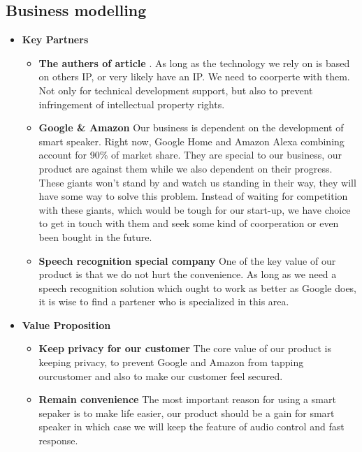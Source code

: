 \documentclass[12pt,twoside]{article}
\begin{document}
\subsection{Business modelling}
\begin{itemize}
\item \textbf{Key Partners}\\
    \begin{itemize}
    \item \textbf{The authers of article} \cite{RoyNirupam2017BMMH}. As long as the technology we rely on is based on others IP, or very likely 
    have an IP. We need to coorperte with them. Not only for technical development support, but also to prevent infringement of 
    intellectual property rights.
    \item \textbf{Google \& Amazon} Our business is dependent on the development of smart speaker. Right now, Google Home and Amazon Alexa combining 
    account for 90\% of market share. They are special to our business, our product are against them while we also dependent on their progress.
    These giants won't stand by and watch us standing in their way, they will have some way to solve this problem. Instead of waiting for competition with 
    these giants, which would be tough for our start-up, we have choice to get in touch with them and seek some kind of coorperation or even been bought 
    in the future.
    \item \textbf{Speech recognition special company} One of the key value of our product is that we do not hurt the convenience. As long as we need a 
    speech recognition solution which ought to work as better as Google does, it is wise to find a partener who is specialized in this area. 

    \end{itemize}

\item \textbf{Value Proposition}\\
\begin{itemize}
    \item \textbf{Keep privacy for our customer} The core value of our product is keeping privacy, to prevent Google and Amazon from tapping ourcustomer
    and also to make our customer feel secured.
    \item \textbf{Remain convenience} The most important reason for using a smart sepaker is to make life easier, our product should be a gain for smart speaker 
    in which case we will keep the feature of audio control and fast response.
\end{itemize}


\end{itemize}
\end{document}
